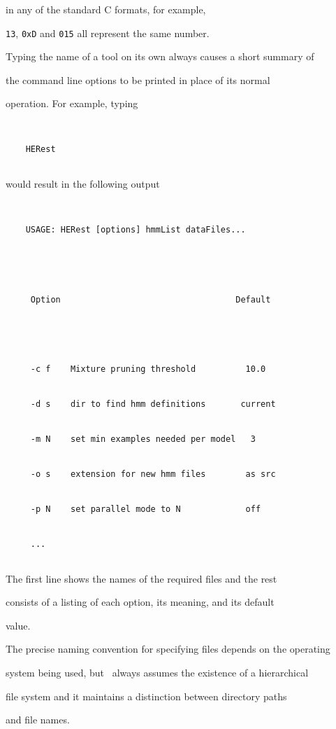 in any of the standard C formats, for example,


\texttt{13}, \texttt{0xD} and \texttt{015} all represent the same number.


Typing the name of a tool on its own always causes a short summary of


the command line options to be printed in place of its normal


operation.  For example, typing


\begin{verbatim}


    HERest


\end{verbatim}


would result in the following output


\begin{verbatim}


    USAGE: HERest [options] hmmList dataFiles...





     Option                                   Default





     -c f    Mixture pruning threshold          10.0


     -d s    dir to find hmm definitions       current


     -m N    set min examples needed per model   3


     -o s    extension for new hmm files        as src


     -p N    set parallel mode to N             off


     ...


\end{verbatim}


The first line shows the names of the required files and the rest


consists of a listing of each option, its meaning, and its default


value.





The precise naming convention for specifying files depends on the operating


system being used, but \HTK\ always assumes the existence of a hierarchical


file system and it maintains a distinction between directory paths


and file names.





